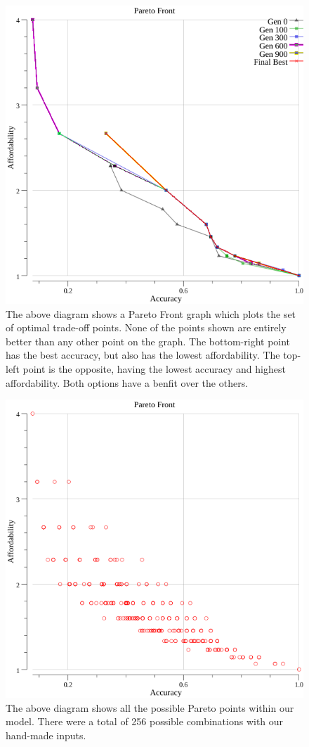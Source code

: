 \documentclass{IEEEtran}
\begin{document}
\begin{figure}[!t]
\centerline{\includegraphics[width=\columnwidth]{points.png}}
\caption{The above diagram shows a Pareto Front graph which plots the set of optimal trade-off points. None of the points shown are entirely better than any other point on the graph. The bottom-right point has the best accuracy, but also has the lowest affordability. The top-left point is the opposite, having the lowest accuracy and highest affordability. Both options have a benfit over the others.}
\end{figure}
\begin{figure}[!t]
\centerline{\includegraphics[width=\columnwidth]{all_pareto_points.png}}
\caption{The above diagram shows all the possible Pareto points within our model. There were a total of 256 possible combinations with our hand-made inputs.}
\end{figure}
\end{document}
